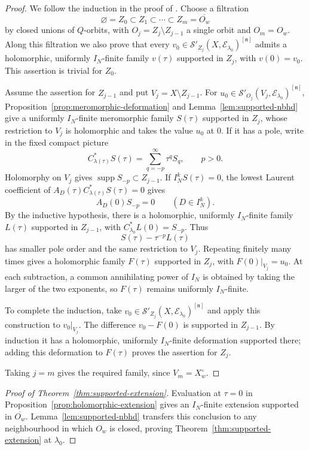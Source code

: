 \documentclass[a4paper,12pt]{amsart}
\numberwithin{equation}{section}
\theoremstyle{definition}
\theoremstyle{remark}
\newcommand{\fn}{\mathfrak n}
\newcommand{\IN}{I_N}
\newcommand{\mcS}{\mathcal S}
\newcommand{\mcE}{\mathcal E}
\newcommand{\supp}{\operatorname{supp}}
\begin{document}
\begin{proof}
We follow the induction in the proof of \cite[Lemma~4.6, p.~445]{Abe12}. Choose a filtration
\[
 \varnothing=Z_0\subset Z_1\subset\cdots\subset Z_m=\overline{O_w}
\]
by closed unions of $Q$-orbits, with $O_j=Z_j\setminus Z_{j-1}$ a single orbit and $O_m=O_w$. Along this filtration we also prove that every $v_0\in\mcS'_{Z_j}(X,\mcE_{\lambda_0})^{[\fn]}$ admits a holomorphic, uniformly $\IN$-finite family $v(\tau)$ supported in $Z_j$, with $v(0)=v_0$. This assertion is trivial for $Z_0$.

Assume the assertion for $Z_{j-1}$ and put $V_j=X\setminus Z_{j-1}$. For $u_0\in\mcS'_{O_j}(V_j,\mcE_{\lambda_0})^{[\fn]}$, Proposition~\ref{prop:meromorphic-deformation} and Lemma~\ref{lem:supported-nbhd} give a uniformly $\IN$-finite meromorphic family $S(\tau)$ supported in $Z_j$, whose restriction to $V_j$ is holomorphic and takes the value $u_0$ at $0$. If it has a pole, write in the fixed compact picture
\[
 C_{\lambda(\tau)}^*S(\tau)=\sum_{q=-p}^{\infty}\tau^qS_q,
 \qquad p>0.
\]
Holomorphy on $V_j$ gives $\supp S_{-p}\subset Z_{j-1}$. If $\IN^kS(\tau)=0$, the lowest Laurent coefficient of $A_D(\tau)C_{\lambda(\tau)}^*S(\tau)=0$ gives
\[
 A_D(0)S_{-p}=0\qquad(D\in\IN^k).
\]
By the inductive hypothesis, there is a holomorphic, uniformly $\IN$-finite family $L(\tau)$ supported in $Z_{j-1}$, with $C_{\lambda_0}^*L(0)=S_{-p}$. Thus
\[
 S(\tau)-\tau^{-p}L(\tau)
\]
has smaller pole order and the same restriction to $V_j$. Repeating finitely many times gives a holomorphic family $F(\tau)$ supported in $Z_j$, with $F(0)|_{V_j}=u_0$. At each subtraction, a common annihilating power of $\IN$ is obtained by taking the larger of the two exponents, so $F(\tau)$ remains uniformly $\IN$-finite.

To complete the induction, take $v_0\in\mcS'_{Z_j}(X,\mcE_{\lambda_0})^{[\fn]}$ and apply this construction to $v_0|_{V_j}$. The difference $v_0-F(0)$ is supported in $Z_{j-1}$. By induction it has a holomorphic, uniformly $\IN$-finite deformation supported there; adding this deformation to $F(\tau)$ proves the assertion for $Z_j$.

Taking $j=m$ gives the required family, since $V_m=X_w^\circ$.
\end{proof}

\begin{proof}[Proof of Theorem~\ref{thm:supported-extension}]
Evaluation at $\tau=0$ in Proposition~\ref{prop:holomorphic-extension} gives an $\IN$-finite extension supported in $\overline{O_w}$. Lemma~\ref{lem:supported-nbhd} transfers this conclusion to any neighbourhood in which $O_w$ is closed, proving Theorem~\ref{thm:supported-extension} at $\lambda_0$.
\end{proof} 
\end{document}
